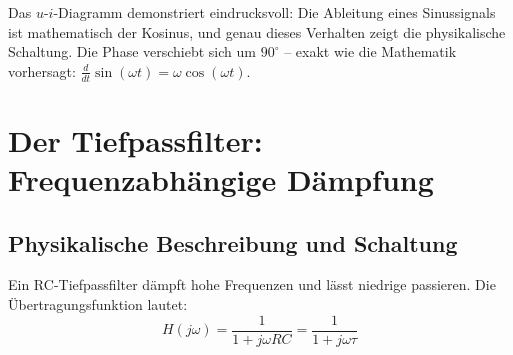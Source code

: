 ﻿\documentclass[12pt, a4paper]{article}
\begin{document}
	Das $u$-$i$-Diagramm demonstriert eindrucksvoll: Die Ableitung eines Sinussignals ist mathematisch der Kosinus, und genau dieses Verhalten zeigt die physikalische Schaltung. Die Phase verschiebt sich um $90^\circ$ -- exakt wie die Mathematik vorhersagt: $\frac{d}{dt}\sin(\omega t) = \omega\cos(\omega t)$.
	
	\section{Der Tiefpassfilter: Frequenzabhängige Dämpfung}
	
	\subsection{Physikalische Beschreibung und Schaltung}
	
	Ein RC-Tiefpassfilter dämpft hohe Frequenzen und lässt niedrige passieren. Die Übertragungsfunktion lautet:
	\begin{equation}
		H(j\omega) = \frac{1}{1 + j\omega RC} = \frac{1}{1 + j\omega\tau}
	\end{equation}
	
\end{document}
